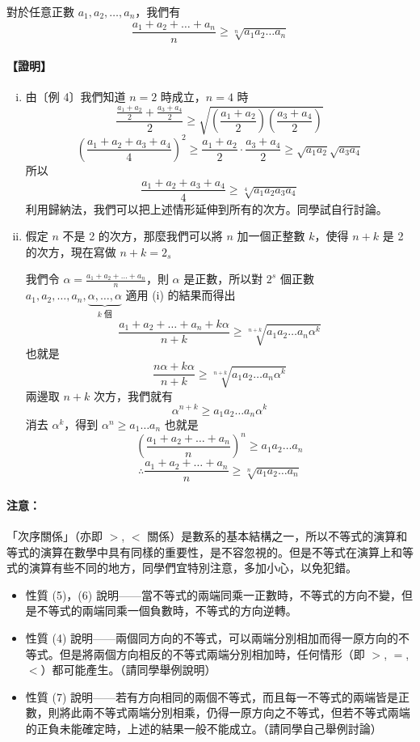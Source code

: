 \begin{example}\label{ex:b2_2-1-5}
對於任意正數 $a_1, a_2, \dots, a_n$，我們有
\[
\frac{a_1+a_2+\dots+a_n}{n} \ge \sqrt[n]{a_1 a_2 \dots a_n}
\]
\end{example}
\paragraph{【證明】} 
\begin{enumerate}[(i)]
    \item 由〔例 4〕我們知道 $n=2$ 時成立，$n=4$ 時
    \[
    \frac{\frac{a_1+a_2}{2}+\frac{a_3+a_4}{2}}{2} \ge \sqrt{\left(\frac{a_1+a_2}{2}\right)\left(\frac{a_3+a_4}{2}\right)}
    \]
    \[
    \left(\frac{a_1+a_2+a_3+a_4}{4}\right)^2 \ge \frac{a_1+a_2}{2}\cdot\frac{a_3+a_4}{2} \ge \sqrt{a_1 a_2}\sqrt{a_3 a_4}
    \]
    所以
    \[
    \frac{a_1+a_2+a_3+a_4}{4} \ge \sqrt[4]{a_1 a_2 a_3 a_4}
    \]
    利用歸納法，我們可以把上述情形延伸到所有的次方。同學試自行討論。

    \item 假定 $n$ 不是 2 的次方，那麼我們可以將 $n$ 加一個正整數 $k$，使得 $n+k$ 是 2 的次方，現在寫做 $n+k=2_s$\label{note:b2-ch2-p29-ex5-subscript}
    
    我們令 $\alpha = \frac{a_1+a_2+\dots+a_n}{n}$，則 $\alpha$ 是正數，所以對 $2^s$ 個正數 $a_1, a_2, \dots, a_n, \underbrace{\alpha, \dots, \alpha}_{k\text{ 個}}$ 適用 (i) 的結果而得出
    \[
    \frac{a_1+a_2+\dots+a_n+k\alpha}{n+k} \ge \sqrt[n+k]{a_1 a_2 \dots a_n \alpha^k}
    \]
    也就是
    \[
    \frac{n\alpha+k\alpha}{n+k} \ge \sqrt[n+k]{a_1 a_2 \dots a_n \alpha^k}
    \]
    兩邊取 $n+k$ 次方，我們就有
    \[
    \alpha^{n+k} \ge a_1 a_2 \dots a_n \alpha^k
    \]
    消去 $\alpha^k$，得到 $\alpha^n \ge a_1 \dots a_n$
    也就是
    \[
    \left(\frac{a_1+a_2+\dots+a_n}{n}\right)^n \ge a_1 a_2 \dots a_n
    \]
    \[
    \therefore \frac{a_1+a_2+\dots+a_n}{n} \ge \sqrt[n]{a_1 a_2 \dots a_n}
    \]
\end{enumerate}

\paragraph{注意：} 「次序關係」（亦即 $>$, $<$ 關係）是數系的基本結構之一，所以不等式的演算和等式的演算在數學中具有同樣的重要性，是不容忽視的。但是不等式在演算上和等式的演算有些不同的地方，同學們宜特別注意，多加小心，以免犯錯。
\begin{itemize}
    \item[（甲）] 性質 (5)，(6) 說明——當不等式的兩端同乘一正數時，不等式的方向不變，但是不等式的兩端同乘一個負數時，不等式的方向逆轉。
    \item[（乙）] 性質 (4) 說明——兩個同方向的不等式，可以兩端分別相加而得一原方向的不等式。但是將兩個方向相反的不等式兩端分別相加時，任何情形（即 $>$, $=$, $<$）都可能產生。（請同學舉例說明）
    \item[（丙）] 性質 (7) 說明——若有方向相同的兩個不等式，而且每一不等式的兩端皆是正數，則將此兩不等式兩端分別相乘，仍得一原方向之不等式，但若不等式兩端的正負未能確定時，上述的結果一般不能成立。（請同學自己舉例討論）
\end{itemize}

